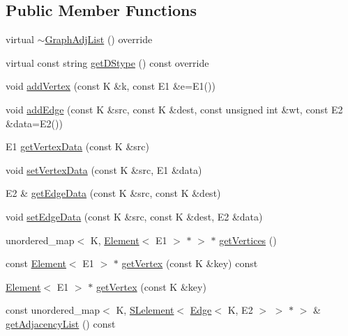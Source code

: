 \subsection*{Public Member Functions}
\begin{DoxyCompactItemize}
\item 
virtual \mbox{\hyperlink{classbridges_1_1_graph_adj_list_af7acceab0f85c75de56cf2fc74b3690b}{$\sim$\+Graph\+Adj\+List}} () override
\item 
virtual const string \mbox{\hyperlink{classbridges_1_1_graph_adj_list_ab1aeeed39ac0e0f66a677e7b0e722030}{get\+D\+Stype}} () const override
\item 
void \mbox{\hyperlink{classbridges_1_1_graph_adj_list_a55565a4aff573c6a7751d7845cdfd5f2}{add\+Vertex}} (const K \&k, const E1 \&e=E1())
\item 
void \mbox{\hyperlink{classbridges_1_1_graph_adj_list_acd9a3bf8e544a6b78e75acd6bf1d57ee}{add\+Edge}} (const K \&src, const K \&dest, const unsigned int \&wt, const E2 \&data=E2())
\item 
E1 \mbox{\hyperlink{classbridges_1_1_graph_adj_list_a2b419a910171cafac2b71ba9f8692e5e}{get\+Vertex\+Data}} (const K \&src)
\item 
void \mbox{\hyperlink{classbridges_1_1_graph_adj_list_aa30a944a429e0422cbe0ddd7bdbd353b}{set\+Vertex\+Data}} (const K \&src, E1 \&data)
\item 
E2 \& \mbox{\hyperlink{classbridges_1_1_graph_adj_list_a3e4b21d0ff4b277502b2bb10e57df3c7}{get\+Edge\+Data}} (const K \&src, const K \&dest)
\item 
void \mbox{\hyperlink{classbridges_1_1_graph_adj_list_ac507940618b400d792c29b69fc9c7687}{set\+Edge\+Data}} (const K \&src, const K \&dest, E2 \&data)
\item 
unordered\+\_\+map$<$ K, \mbox{\hyperlink{classbridges_1_1_element}{Element}}$<$ E1 $>$ $\ast$ $>$ $\ast$ \mbox{\hyperlink{classbridges_1_1_graph_adj_list_a157c80e2bd439572f4f80e8850700297}{get\+Vertices}} ()
\item 
const \mbox{\hyperlink{classbridges_1_1_element}{Element}}$<$ E1 $>$ $\ast$ \mbox{\hyperlink{classbridges_1_1_graph_adj_list_a9a222bfc1d37f459caac60508b816fb6}{get\+Vertex}} (const K \&key) const
\item 
\mbox{\hyperlink{classbridges_1_1_element}{Element}}$<$ E1 $>$ $\ast$ \mbox{\hyperlink{classbridges_1_1_graph_adj_list_a8ba3aefe8e118ce8d8d6fab807e494c1}{get\+Vertex}} (const K \&key)
\item 
const unordered\+\_\+map$<$ K, \mbox{\hyperlink{classbridges_1_1_s_lelement}{S\+Lelement}}$<$ \mbox{\hyperlink{classbridges_1_1_edge}{Edge}}$<$ K, E2 $>$ $>$ $\ast$ $>$ \& \mbox{\hyperlink{classbridges_1_1_graph_adj_list_ac26efd5d2e57a8b8881c57e515e80bcf}{get\+Adjacency\+List}} () const

\end{DoxyCompactItemize}
